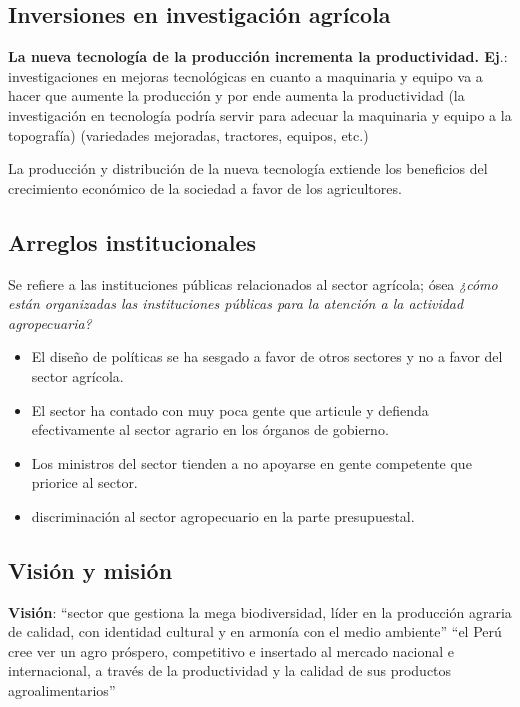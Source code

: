 \documentclass[
  letterpaper,
  DIV=11,
  numbers=noendperiod]{scrartcl}
\begin{document}
\hypertarget{inversiones-en-investigaciuxf3n-agruxedcola}{%
\subsection{Inversiones en investigación
agrícola}\label{inversiones-en-investigaciuxf3n-agruxedcola}}

\textbf{La nueva tecnología de la producción incrementa la
productividad. Ej}.: investigaciones en mejoras tecnológicas en cuanto a
maquinaria y equipo va a hacer que aumente la producción y por ende
aumenta la productividad (la investigación en tecnología podría servir
para adecuar la maquinaria y equipo a la topografía) (variedades
mejoradas, tractores, equipos, etc.)

La producción y distribución de la nueva tecnología extiende los
beneficios del crecimiento económico de la sociedad a favor de los
agricultores.

\hypertarget{arreglos-institucionales}{%
\subsection{Arreglos institucionales}\label{arreglos-institucionales}}

Se refiere a las instituciones públicas relacionados al sector agrícola;
ósea \emph{¿cómo están organizadas las instituciones públicas para la
atención a la actividad agropecuaria?}

\begin{itemize}
\item
  El diseño de políticas se ha sesgado a favor de otros sectores y no a
  favor del sector agrícola.
\item
  El sector ha contado con muy poca gente que articule y defienda
  efectivamente al sector agrario en los órganos de gobierno.
\item
  Los ministros del sector tienden a no apoyarse en gente competente que
  priorice al sector.
\item
  discriminación al sector agropecuario en la parte presupuestal.
\end{itemize}

\hypertarget{visiuxf3n-y-misiuxf3n}{%
\subsection{Visión y misión}\label{visiuxf3n-y-misiuxf3n}}

\textbf{Visión}: ``sector que gestiona la mega biodiversidad, líder en
la producción agraria de calidad, con identidad cultural y en armonía
con el medio ambiente'' ``el Perú cree ver un agro próspero, competitivo
e insertado al mercado nacional e internacional, a través de la
productividad y la calidad de sus productos agroalimentarios''
\end{document}
